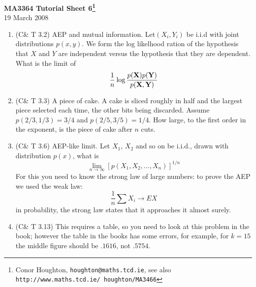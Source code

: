 \documentclass[12pt]{article}
\begin{document}
\begin{center}
{\bf MA3364 Tutorial Sheet 6\footnote{Conor Houghton, {\tt houghton@maths.tcd.ie}, see also {\tt http://www.maths.tcd.ie/ houghton/MA3466}}}\\[1cm]{} 19 March 2008
\end{center}
\begin{enumerate}

\item (C\& T 3.2) AEP and mutual information. Let$(X_i,Y_i)$ be i.i.d with joint distributions $p(x,y)$. We form the log likelhood ration of the hypothesis that $X$ and $Y$ are independent versus the hypothesis that they are dependent. What is the limit of 
\begin{equation}
\frac{1}{n}\log{\frac{p({\bf X})p({\bf Y})}{p({\bf X},{\bf Y})}}
\end{equation}

\item (C\& T 3.3) A piece of cake. A cake is sliced roughly in half and the largest piece selected each time, the other bits being discarded. Assume $p(2/3,1/3)=3/4$ and $p(2/5,3/5)=1/4$. How large, to the first order in the exponent, is the piece of cake after $n$ cuts.

\item (C\& T 3.6) AEP-like limit. Let $X_1$, $X_2$ and so on be i.i.d., drawn with distribution $p(x)$, what is
\begin{equation}
\lim_{n\rightarrow \infty}[p(X_1,X_2,\ldots,X_n)]^{1/n}
\end{equation}
For this you need to know the strong law of large numbers: to prove the AEP we used the weak law:
\begin{equation}
\frac{1}{n}\sum X_i \rightarrow EX
\end{equation}
in probability, the strong law states that it approaches it almost surely.


\item (C\& T 3.13) This requires a table, so you need to look at this
  problem in the book; however the table in the books has some errors,
  for example, for $k=15$ the middle figure should be $.1616$, not
  $.5754$.



\end{enumerate}
\end{document}

